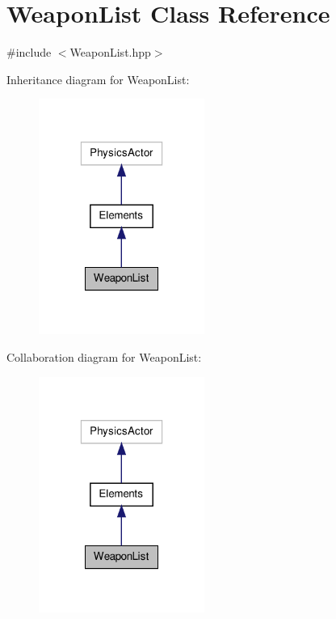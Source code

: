 \hypertarget{class_weapon_list}{\section{Weapon\-List Class Reference}
\label{class_weapon_list}
}


{\ttfamily \#include $<$Weapon\-List.\-hpp$>$}



Inheritance diagram for Weapon\-List\-:
\nopagebreak
\begin{figure}[H]
\begin{center}
\leavevmode
\includegraphics[width=154pt]{class_weapon_list__inherit__graph}
\end{center}
\end{figure}


Collaboration diagram for Weapon\-List\-:
\nopagebreak
\begin{figure}[H]
\begin{center}
\leavevmode
\includegraphics[width=154pt]{class_weapon_list__coll__graph}
\end{center}
\end{figure}
